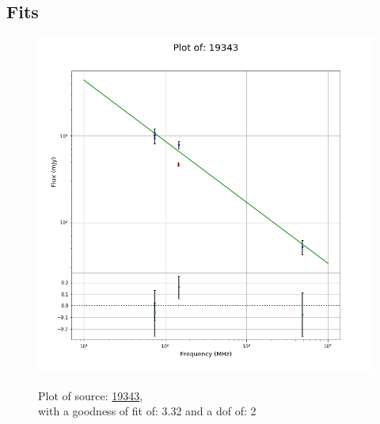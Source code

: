 \documentclass{article}
\begin{document}
\subsection{Fits}
\begin{figure}[H]
    \centering
    \begin{minipage}{.5\textwidth}
        \centering
        \includegraphics[scale = 0.35]{KmeulenTrap4P23_1min/1min19343.png}
        \captionsetup{labelformat=empty}
        \caption{Plot of source: \href{http://banana.transientskp.org/r4/vlo_KmeulenTrap4P23/runningcatalog/19343}{19343},\\with a goodness of fit of: 3.32 and a dof of: 2}
        \addtocounter{figure}{-1}
        \label{KmeulenTrap4P23:1min:19343:plot}
    \end{minipage}%
    \begin{minipage}{0.5\textwidth}
        \centering


\end{minipage}
\end{figure}
\end{document}
